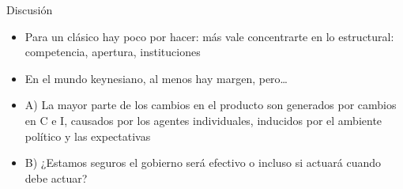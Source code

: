 \documentclass{beamer}
\begin{document}


   
%       
 
    


\begin{frame}{Discusión}

    \begin{itemize}
    \item Para un clásico hay poco por hacer: más vale concentrarte en lo estructural: competencia, apertura, instituciones
    \item En el mundo keynesiano, al menos hay margen, pero…
    \item A) La mayor parte de los cambios en el producto son generados por cambios en C e I, causados por los agentes individuales, inducidos por el ambiente político y las expectativas
    \item B) ¿Estamos seguros el gobierno será efectivo o incluso si actuará cuando debe actuar? 
    \end{itemize}

\end{frame}

\end{document}
